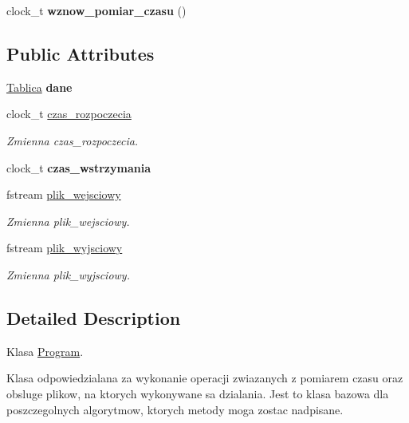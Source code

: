 \begin{DoxyCompactItemize}
\item 
\hypertarget{class_program_a7c069b25265a74e466ac9b868fcf0a9d}{clock\+\_\+t {\bfseries wznow\+\_\+pomiar\+\_\+czasu} ()}\label{class_program_a7c069b25265a74e466ac9b868fcf0a9d}

\end{DoxyCompactItemize}
\subsection*{Public Attributes}
\begin{DoxyCompactItemize}
\item 
\hypertarget{class_program_ac27fc896de0e4c87cc6a17290c0930ef}{\hyperlink{class_tablica}{Tablica} {\bfseries dane}}\label{class_program_ac27fc896de0e4c87cc6a17290c0930ef}

\item 
clock\+\_\+t \hyperlink{class_program_a8cdcc795adc329732f41b399044d0a5b}{czas\+\_\+rozpoczecia}
\begin{DoxyCompactList}\small\item\em Zmienna czas\+\_\+rozpoczecia. \end{DoxyCompactList}\item 
\hypertarget{class_program_aded0e8c471b06c63a58d47994ddac83f}{clock\+\_\+t {\bfseries czas\+\_\+wstrzymania}}\label{class_program_aded0e8c471b06c63a58d47994ddac83f}

\item 
fstream \hyperlink{class_program_a532ceacb1d70da66142bab96a3eb0753}{plik\+\_\+wejsciowy}
\begin{DoxyCompactList}\small\item\em Zmienna plik\+\_\+wejsciowy. \end{DoxyCompactList}\item 
fstream \hyperlink{class_program_aaa305591a4333d799c8d353f3072d8e0}{plik\+\_\+wyjsciowy}
\begin{DoxyCompactList}\small\item\em Zmienna plik\+\_\+wyjsciowy. \end{DoxyCompactList}\end{DoxyCompactItemize}


\subsection{Detailed Description}
Klasa \hyperlink{class_program}{Program}. 

Klasa odpowiedzialana za wykonanie operacji zwiazanych z pomiarem czasu oraz obsluge plikow, na ktorych wykonywane sa dzialania. Jest to klasa bazowa dla poszczegolnych algorytmow, ktorych metody moga zostac nadpisane. 

